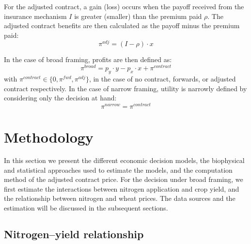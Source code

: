 \documentclass[12pt,a4paper]{article}
\begin{document}
For the adjusted contract, a gain (loss) occurs when the payoff received from the insurance mechanism $I$ is greater (smaller) than the premium paid $\rho$. The adjusted contract benefits are then calculated as the payoff minus the premium paid:
\begin{equation}
\pi^{adj} = (I - \rho) \cdot x
\label{eq:adj_payoff}
\end{equation}

In the case of broad framing, profits are then defined as:
\begin{equation}
\pi^{broad} = p_y \cdot y - p_x \cdot x + \pi^{contract}
\label{eq:broad}
\end{equation}
with $\pi^{contract} \in \{0, \pi^{fwd}, \pi^{adj}\}$, in the case of no contract, forwards, or adjusted contract respectively. In the case of narrow framing, utility is narrowly defined by considering only the decision at hand:
\begin{equation}
\pi^{narrow} = \pi^{contract}
\label{eq:narrow}
\end{equation}

\section{Methodology}
\label{sec:methodology}

In this section we present the different economic decision models, the biophysical and statistical approaches used to estimate the models, and the computation method of the adjusted contract price. For the decision under broad framing, we first estimate the interactions between nitrogen application and crop yield, and the relationship between nitrogen and wheat prices. The data sources and the estimation will be discussed in the subsequent sections.

\subsection{Nitrogen--yield relationship}
\end{document}
